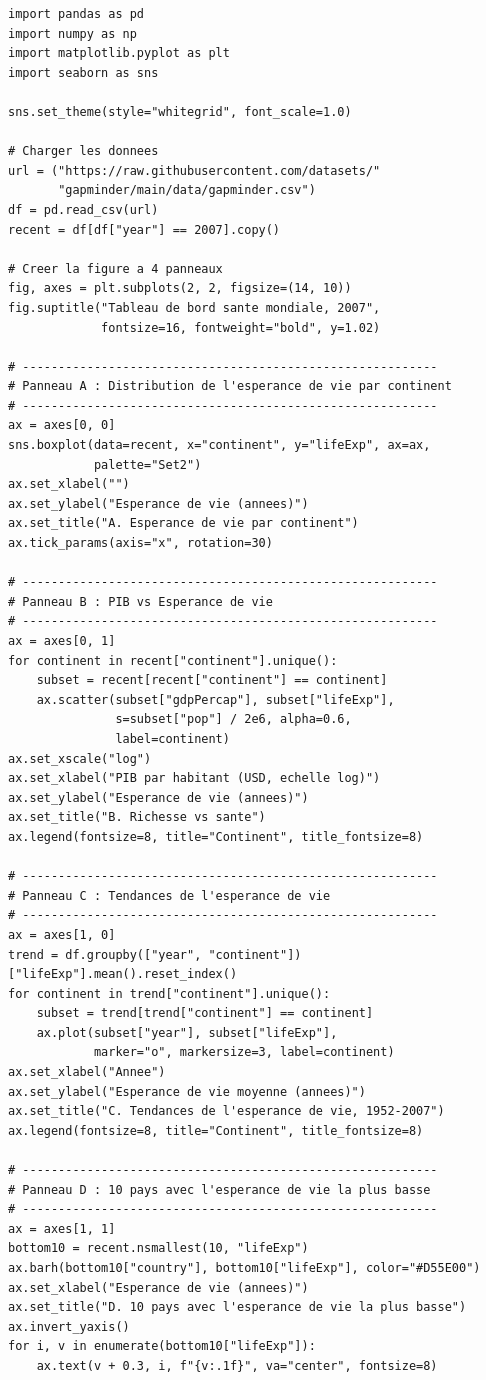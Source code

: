 \begin{verbatim}
import pandas as pd
import numpy as np
import matplotlib.pyplot as plt
import seaborn as sns

sns.set_theme(style="whitegrid", font_scale=1.0)

# Charger les donnees
url = ("https://raw.githubusercontent.com/datasets/"
       "gapminder/main/data/gapminder.csv")
df = pd.read_csv(url)
recent = df[df["year"] == 2007].copy()

# Creer la figure a 4 panneaux
fig, axes = plt.subplots(2, 2, figsize=(14, 10))
fig.suptitle("Tableau de bord sante mondiale, 2007",
             fontsize=16, fontweight="bold", y=1.02)

# ----------------------------------------------------------
# Panneau A : Distribution de l'esperance de vie par continent
# ----------------------------------------------------------
ax = axes[0, 0]
sns.boxplot(data=recent, x="continent", y="lifeExp", ax=ax,
            palette="Set2")
ax.set_xlabel("")
ax.set_ylabel("Esperance de vie (annees)")
ax.set_title("A. Esperance de vie par continent")
ax.tick_params(axis="x", rotation=30)

# ----------------------------------------------------------
# Panneau B : PIB vs Esperance de vie
# ----------------------------------------------------------
ax = axes[0, 1]
for continent in recent["continent"].unique():
    subset = recent[recent["continent"] == continent]
    ax.scatter(subset["gdpPercap"], subset["lifeExp"],
               s=subset["pop"] / 2e6, alpha=0.6,
               label=continent)
ax.set_xscale("log")
ax.set_xlabel("PIB par habitant (USD, echelle log)")
ax.set_ylabel("Esperance de vie (annees)")
ax.set_title("B. Richesse vs sante")
ax.legend(fontsize=8, title="Continent", title_fontsize=8)

# ----------------------------------------------------------
# Panneau C : Tendances de l'esperance de vie
# ----------------------------------------------------------
ax = axes[1, 0]
trend = df.groupby(["year", "continent"])["lifeExp"].mean().reset_index()
for continent in trend["continent"].unique():
    subset = trend[trend["continent"] == continent]
    ax.plot(subset["year"], subset["lifeExp"],
            marker="o", markersize=3, label=continent)
ax.set_xlabel("Annee")
ax.set_ylabel("Esperance de vie moyenne (annees)")
ax.set_title("C. Tendances de l'esperance de vie, 1952-2007")
ax.legend(fontsize=8, title="Continent", title_fontsize=8)

# ----------------------------------------------------------
# Panneau D : 10 pays avec l'esperance de vie la plus basse
# ----------------------------------------------------------
ax = axes[1, 1]
bottom10 = recent.nsmallest(10, "lifeExp")
ax.barh(bottom10["country"], bottom10["lifeExp"], color="#D55E00")
ax.set_xlabel("Esperance de vie (annees)")
ax.set_title("D. 10 pays avec l'esperance de vie la plus basse")
ax.invert_yaxis()
for i, v in enumerate(bottom10["lifeExp"]):
    ax.text(v + 0.3, i, f"{v:.1f}", va="center", fontsize=8)


\end{verbatim}
